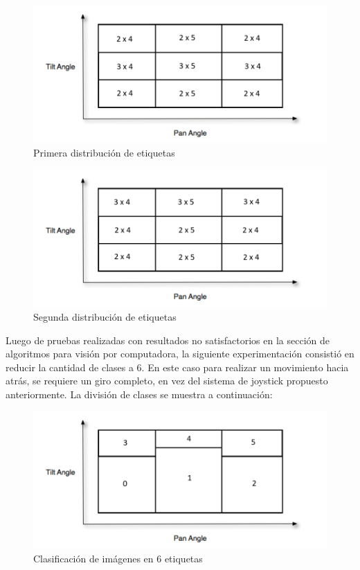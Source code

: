 \begin{figure}[H]
	\centering
	\includegraphics[scale=1]{figures/clasi01.png}
	\caption{Primera distribución de etiquetas}
	\label{fig:img4}
\end{figure}

\begin{figure}[H]
	\centering
	\includegraphics[scale=1]{figures/clasi02.png}
	\caption{Segunda distribución de etiquetas}
	\label{fig:img5}
\end{figure}

Luego de pruebas realizadas con resultados no satisfactorios en la sección de algoritmos para visión por computadora, la siguiente experimentación consistió en reducir la cantidad de clases a 6. En este caso para realizar un movimiento hacia atrás, se requiere un giro completo, en vez del sistema de joystick propuesto anteriormente. La división de clases se muestra a continuación:

\begin{figure}[H]
	\centering
	\includegraphics[scale=1]{figures/clasi1.png}
	\caption{Clasificación de imágenes en 6 etiquetas}
	\label{fig:img6}
\end{figure}

